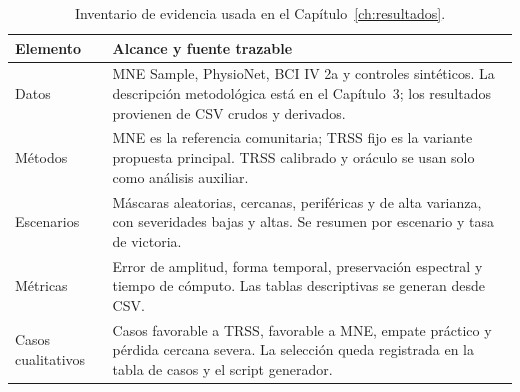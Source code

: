 \begin{table}[htbp]
\centering
\small
\setlength{\tabcolsep}{5pt}
\caption{Inventario de evidencia usada en el Capítulo~\ref{ch:resultados}.}
\label{tab:ch4_evidence_inventory}
\begin{tabular}{@{}>{\raggedright\arraybackslash}p{2.7cm}>{\raggedright\arraybackslash}p{8.6cm}@{}}
\toprule
Elemento & Alcance y fuente trazable \\
\midrule
Datos & MNE Sample, PhysioNet, BCI IV 2a y controles sintéticos. La descripción metodológica está en el Capítulo~3; los resultados provienen de CSV crudos y derivados. \\
Métodos & MNE es la referencia comunitaria; TRSS fijo es la variante propuesta principal. TRSS calibrado y oráculo se usan solo como análisis auxiliar. \\
Escenarios & Máscaras aleatorias, cercanas, periféricas y de alta varianza, con severidades bajas y altas. Se resumen por escenario y tasa de victoria. \\
Métricas & Error de amplitud, forma temporal, preservación espectral y tiempo de cómputo. Las tablas descriptivas se generan desde CSV. \\
Casos cualitativos & Casos favorable a TRSS, favorable a MNE, empate práctico y pérdida cercana severa. La selección queda registrada en la tabla de casos y el script generador. \\
\bottomrule
\end{tabular}
\end{table}
